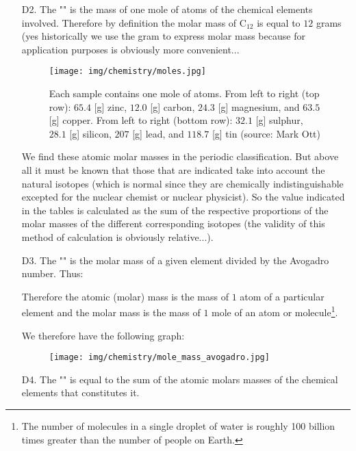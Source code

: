 \begin{enumerate}
		\item[D2.] The "\label{molar mass}" is the mass of one mole of atoms of the chemical elements involved. Therefore by definition the molar mass of $\mathrm{C}_{12}$ is equal to $12$ grams (yes historically we use the gram to express molar mass because for application purposes is obviously more convenient...
		\begin{figure}[H]
			\centering
			\texttt{[image: img/chemistry/moles.jpg]}
			\caption[]{Each sample contains one mole of atoms. From left to right (top row): $65.4$ [g] zinc, $12.0$ [g] carbon, $24.3$ [g] magnesium, and $63.5$ [g] copper. From left to right (bottom row): $32.1$ [g] sulphur, $28.1$ [g] silicon, $207$ [g] lead, and $118.7$ [g] tin (source: Mark Ott)}
		\end{figure}
		\begin{tcolorbox}[title=Remark,colframe=black,arc=10pt]
		We find these atomic molar masses in the periodic classification. But above all it must be known that those that are indicated take into account the natural isotopes (which is normal since they are chemically indistinguishable excepted for the nuclear chemist or nuclear physicist). So the value indicated in the tables is calculated as the sum of the respective proportions of the molar masses of the different corresponding isotopes (the validity of this method of calculation is obviously relative...).
		\end{tcolorbox}	
		
		\item[D3.] The "" is the molar mass of a given element divided by the Avogadro number. Thus:
		
		Therefore the atomic (molar) mass is the mass of $1$ atom of a particular element and the molar mass is the mass of $1$ mole of an atom or molecule\footnote{The number of molecules in a single droplet of water is roughly 100 billion times greater than the number of people on Earth.}.
		
		We therefore have the following graph:
		\begin{figure}[H]
			\begin{center}
				\texttt{[image: img/chemistry/mole\_mass\_avogadro.jpg]}
			\end{center}	
		\end{figure}
		
		\item[D4.] The "" is equal to the sum of the atomic molars  masses of the chemical elements that constitutes it.
		

\end{enumerate}
